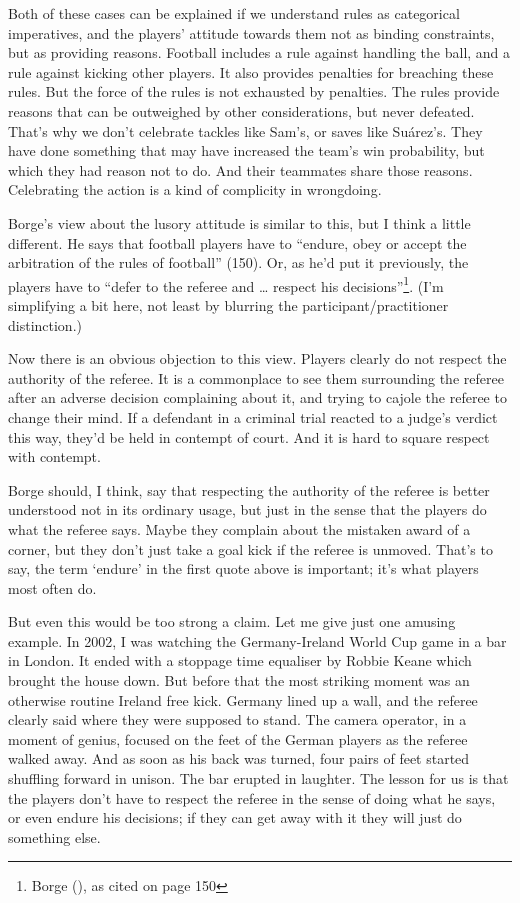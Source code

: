 \documentclass[
  10pt,
  letterpaper,
  DIV=11,
  numbers=noendperiod,
  twoside]{scrartcl}
\begin{document}
Both of these cases can be explained if we understand rules as
categorical imperatives, and the players' attitude towards them not as
binding constraints, but as providing reasons. Football includes a rule
against handling the ball, and a rule against kicking other players. It
also provides penalties for breaching these rules. But the force of the
rules is not exhausted by penalties. The rules provide reasons that can
be outweighed by other considerations, but never defeated. That's why we
don't celebrate tackles like Sam's, or saves like Suárez's. They have
done something that may have increased the team's win probability, but
which they had reason not to do. And their teammates share those
reasons. Celebrating the action is a kind of complicity in wrongdoing.

Borge's view about the lusory attitude is similar to this, but I think a
little different. He says that football players have to ``endure, obey
or accept the arbitration of the rules of football'' (150). Or, as he'd
put it previously, the players have to ``defer to the referee and
\ldots{} respect his decisions''\footnote{Borge
  (), as cited on page 150}. (I'm
simplifying a bit here, not least by blurring the
participant/practitioner distinction.)

Now there is an obvious objection to this view. Players clearly do not
respect the authority of the referee. It is a commonplace to see them
surrounding the referee after an adverse decision complaining about it,
and trying to cajole the referee to change their mind. If a defendant in
a criminal trial reacted to a judge's verdict this way, they'd be held
in contempt of court. And it is hard to square respect with contempt.

Borge should, I think, say that respecting the authority of the referee
is better understood not in its ordinary usage, but just in the sense
that the players do what the referee says. Maybe they complain about the
mistaken award of a corner, but they don't just take a goal kick if the
referee is unmoved. That's to say, the term `endure' in the first quote
above is important; it's what players most often do.

But even this would be too strong a claim. Let me give just one amusing
example. In 2002, I was watching the Germany-Ireland World Cup game in a
bar in London. It ended with a stoppage time equaliser by Robbie Keane
which brought the house down. But before that the most striking moment
was an otherwise routine Ireland free kick. Germany lined up a wall, and
the referee clearly said where they were supposed to stand. The camera
operator, in a moment of genius, focused on the feet of the German
players as the referee walked away. And as soon as his back was turned,
four pairs of feet started shuffling forward in unison. The bar erupted
in laughter. The lesson for us is that the players don't have to respect
the referee in the sense of doing what he says, or even endure his
decisions; if they can get away with it they will just do something
else.
\end{document}
